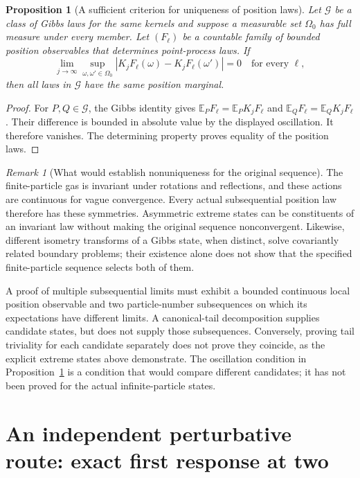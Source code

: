 \documentclass[11pt,a4paper]{article}
\numberwithin{equation}{section}
\newtheorem{proposition}[theorem]{Proposition}
\theoremstyle{definition}
\theoremstyle{remark}
\newtheorem{remark}[theorem]{Remark}
\newcommand{\E}{\mathbb E}
\begin{document}
\begin{proposition}[A sufficient criterion for uniqueness of position laws]
\label{prop:canonical-kernel-oscillation-uniqueness}
Let $\mathcal G$ be a class of Gibbs laws for the same kernels and
suppose a measurable set $\Omega_0$ has full measure under every
member. Let $(F_\ell)$ be a countable family of bounded position
observables that determines point-process laws. If
\[
 \lim_{j\to\infty}
 \sup_{\omega,\omega'\in\Omega_0}
       |K_jF_\ell(\omega)-K_jF_\ell(\omega')|=0
 \quad\text{for every }\ell,
\]
then all laws in $\mathcal G$ have the same position marginal.
\end{proposition}
\begin{proof}
For $P,Q\in\mathcal G$, the Gibbs identity gives
$\E_PF_\ell=\E_PK_jF_\ell$ and
$\E_QF_\ell=\E_QK_jF_\ell$. Their difference is bounded in
absolute value by the displayed oscillation. It therefore vanishes.
The determining property proves equality of the position laws.
\end{proof}

\begin{remark}[What would establish nonuniqueness for the original sequence]
The finite-particle gas is invariant under rotations and reflections,
and these actions are continuous for vague convergence. Every actual
subsequential position law therefore has these symmetries. Asymmetric
extreme states can be constituents of an invariant law without making
the original sequence nonconvergent. Likewise, different isometry
transforms of a Gibbs state, when distinct, solve covariantly related
boundary problems; their existence alone does not show that the
specified finite-particle sequence selects both of them.

A proof of multiple subsequential limits must exhibit a bounded
continuous local position observable and two particle-number
subsequences on which its expectations have different limits. A
canonical-tail decomposition supplies candidate states, but does not
supply those subsequences. Conversely, proving tail triviality for
each candidate separately does not prove they coincide, as the explicit
extreme states above demonstrate. The oscillation condition in
Proposition~\ref{prop:canonical-kernel-oscillation-uniqueness} is a
condition that would compare different candidates; it has not been
proved for the actual infinite-particle states.
\end{remark}

\section{An independent perturbative route: exact first response at two}
\label{sec:beta2-linear-response}
\end{document}

